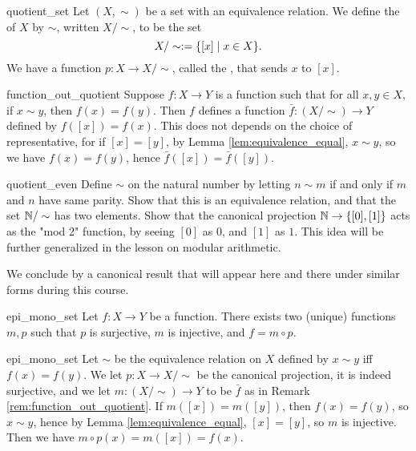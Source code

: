 \begin{cdef}{}{quotient_set}
    Let \( (X, \sim) \) be a set with an equivalence relation. We define the  of \( X \) by \( \sim \), written \( X/\sim \), to be the set
    \begin{equation*}
        X/\sim := \{ [x] \mid x \in X \}.
    \end{equation*}
    We have a function \( p : X \to X / \sim \), called the , that sends \( x \) to \( [x] \).
\end{cdef}

\begin{crem}{}{function_out_quotient}
    Suppose \( f : X \to Y \) is a function such that for all \( x, y \in X \), if \( x \sim y \), then \( f(x) = f(y) \). Then \( f \) defines a function \( \bar f : (X / \sim) \to Y \) defined by \( f([x]) = f(x) \). This does not depends on the choice of representative, for if \( [x] = [y] \), by Lemma \ref{lem:equivalence_equal}, \( x \sim y \), so we have \( f(x) = f(y) \), hence \( \bar f([x]) = \bar f([y]) \). 
\end{crem}

\begin{cex}{}{quotient_even}
    Define \( \sim \) on the natural number by letting \( n \sim m \) if and only if \( m \) and \( n \) have same parity. Show that this is an equivalence relation, and that the set \( \mathbb{N} / \sim \) has two elements. Show that the canonical projection \( \mathbb{N} \to \{ [0], [1] \} \) acts as the "mod 2" function, by seeing \( [0] \) as \( 0 \), and \( [1] \) as \( 1 \). This idea will be further generalized in the lesson on modular arithmetic.
\end{cex}

We conclude by a canonical result that will appear here and there under similar forms during this course.
\begin{cthm}{}{epi_mono_set}
    Let \( f : X \to Y \) be a function. There exists two (unique) functions \( m, p \) such that \( p \) is surjective, \( m \) is injective, and \( f = m \circ p \). 
\end{cthm}
\begin{thmproof}{epi_mono_set}
    Let \( \sim \) be the equivalence relation on \( X \) defined by \( x \sim y \) iff \( f(x) = f(y) \). We let \( p : X \to X/\sim \) be the canonical projection, it is indeed surjective, and we let \( m : (X/\sim) \to Y \) to be \( \bar f \) as in Remark \ref{rem:function_out_quotient}. If \( m([x]) = m([y]) \), then \( f(x) = f(y) \), so \( x \sim y \), hence by Lemma \ref{lem:equivalence_equal}, \( [x] = [y] \), so \( m \) is injective. Then we have \( m\circ p(x) = m([x]) = f(x) \).
\end{thmproof}